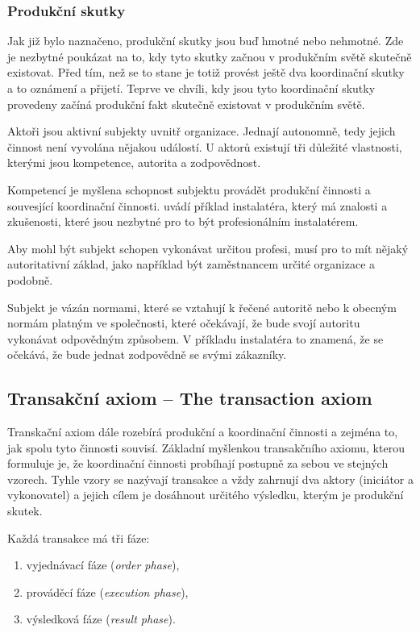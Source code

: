 \documentclass[]{article}
\begin{document}

\subsubsection{Produkční skutky}
Jak již bylo naznačeno, produkční skutky jsou buď hmotné nebo nehmotné. Zde je nezbytné poukázat na to, kdy tyto skutky začnou v produkčním světě skutečně existovat. Před tím, než se to stane je totiž provést ještě dva koordinační skutky a to oznámení a přijetí. Teprve ve chvíli, kdy jsou tyto koordinační skutky provedeny začíná produkční fakt skutečně existovat v produkčním světě.

Aktoři jsou aktivní subjekty uvnitř organizace. Jednají autonomně, tedy jejich činnost není vyvolána nějakou událostí. \cite{Dietz2005} U aktorů existují tři důležité vlastnosti, kterými jsou kompetence, autorita a zodpovědnost.

Kompetencí je myšlena schopnost subjektu provádět produkční činnosti a souvesjící koordinační činnosti. \cite{Dietz2005} uvádí příklad instalatéra, který má znalosti a zkušenosti, které jsou nezbytné pro to být profesionálním instalatérem.

Aby mohl být subjekt schopen vykonávat určitou profesi, musí pro to mít nějaký autoritativní základ, jako například být zaměstnancem určité organizace a podobně.

Subjekt je vázán normami, které se vztahují k řečené autoritě nebo k obecným normám platným ve společnosti, které očekávají, že bude svojí autoritu vykonávat odpovědným způsobem. V příkladu instalatéra to znamená, že se očekává, že bude jednat zodpovědně se svými zákazníky.

\subsection{Transakční axiom – The transaction axiom}
Transkační axiom dále rozebírá produkční a koordinační činnosti a zejména to, jak spolu tyto činnosti souvisí. Základní myšlenkou transakčního axiomu, kterou formuluje \cite{Dietz2005} je, že koordinační činnosti probíhají postupně za sebou ve stejných vzorech. Tyhle vzory se nazývají transakce a vždy zahrnují dva aktory (iniciátor a vykonovatel) a jejich cílem je dosáhnout určitého výsledku, kterým je produkční skutek.

Každá transakce má tři fáze:

\begin{enumerate}
\item vyjednávací fáze (\textit{order phase}),
\item prováděcí fáze (\textit{execution phase}),
\item výsledková fáze (\textit{result phase}).
\end{enumerate}
\end{document}
